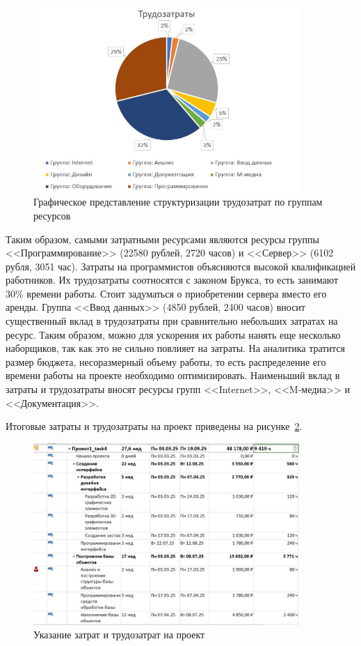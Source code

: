 \begin{figure}[H]
	\centering
	\includegraphics[width=0.9\textwidth]{img/lab2/task3/work_diagram.jpg}
	\caption{Графическое представление структуризации трудозатрат по группам ресурсов}
	\label{fig:work_diagram}
\end{figure}

Таким образом, самыми затратными ресурсами являются ресурсы группы <<Программирование>> (22580 рублей, 2720 часов) и <<Сервер>> (6102 рубля, 3051 час).
Затраты на программистов объясняются высокой квалификацией работников.
Их трудозатраты соотносятся с законом Брукса, то есть занимают 30\% времени работы.
Стоит задуматься о приобретении сервера вместо его аренды.
Группа <<Ввод данных>> (4850 рублей, 2400 часов) вносит существенный вклад в трудозатраты при сравнительно небольших затратах на ресурс.
Таким образом, можно для ускорения их работы нанять еще несколько наборщиков, так как это не сильно повлияет на затраты.
На аналитика тратится размер бюджета, несоразмерный объему работы, то есть распределение его времени работы на проекте необходимо оптимизировать.
Наименьший вклад в затраты и трудозатраты вносят ресурсы групп <<Internet>>, <<M-медиа>> и <<Документация>>.

Итоговые затраты и трудозатраты на проект приведены на рисунке~\ref{fig:final}.
\begin{figure}[H]
	\centering
	\includegraphics[width=0.9\textwidth]{img/lab2/task3/final.jpg}
	\caption{Указание затрат и трудозатрат на проект}
	\label{fig:final}
\end{figure}

